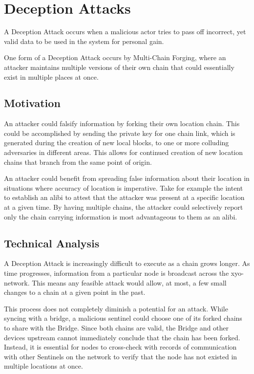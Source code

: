 \documentclass{article}
\begin{document}
\section{Deception Attacks}
A Deception Attack occurs when a malicious actor tries to pass off incorrect, yet valid data to be used in the system for personal gain.

One form of a Deception Attack occurs by Multi-Chain Forging, where an attacker maintains multiple versions of their own chain that could essentially exist in multiple places at once.

\subsection{Motivation}

An attacker could falsify information by forking their own location chain. This could be accomplished by sending the private key for one chain link, which is generated during the creation of new local blocks, to one or more colluding adversaries in different areas. This allows for continued creation of new location chains that branch from the same point of origin.

An attacker could benefit from spreading false information about their location in situations where accuracy of location is imperative. Take for example the intent to establish an alibi to attest that the attacker was present at a specific location at a given time. By having multiple chains, the attacker could selectively report only the chain carrying information is most advantageous to them as an alibi.

\subsection{Technical Analysis}

A Deception Attack is increasingly difficult to execute as a chain grows longer. As time progresses, information from a particular node is broadcast across the \Gls{xyo-network}. This means any feasible attack would allow, at most, a few small changes to a chain at a given point in the past.

This process does not completely diminish a potential for an attack. While syncing with a \Gls{bridge}, a malicious \Gls{sentinel} could choose one of its forked chains to share with the Bridge. Since both chains are valid, the Bridge and other  devices upstream cannot immediately conclude that the chain has been forked. Instead, it is essential for nodes to cross-check with records of communication with other Sentinels on the network to verify that the node has not existed in multiple locations at once. 
\end{document}
